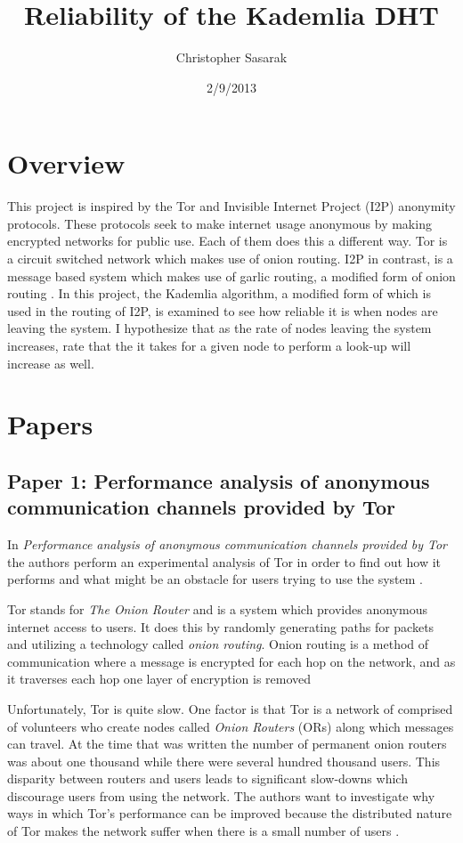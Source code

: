 \documentclass[notitlepage,12pt]{article}
\author{Christopher Sasarak}
\date{2/9/2013}
\title{Reliability of the Kademlia DHT}
\begin{document}
\maketitle

\section{Overview}
\label{sec:over}

This project is inspired by the Tor and Invisible Internet Project (I2P)
anonymity protocols. These protocols seek to make internet usage anonymous by
making encrypted networks for public use. Each of them does this a different
way. Tor is a circuit switched network which makes use of onion
routing\cite{tor}. I2P in contrast, is a message based system which makes use of
garlic routing, a modified form of onion routing \cite{i2p}. In this project,
the Kademlia algorithm, a modified form of which is used in the routing of I2P,
is examined to see how reliable it is when nodes are leaving the system. I
hypothesize that as the rate of nodes leaving the system increases, rate that
the it takes for a given node to perform a look-up will increase as well.

\section{Papers}
\label{sec:papers}

\subsection{Paper 1: Performance analysis of anonymous communication channels provided by Tor}
\label{sec:Tor}

In \emph{Performance analysis of anonymous communication channels
  provided by Tor} the authors perform an experimental analysis of Tor
in order to find out how it performs and what might be an obstacle for
users trying to use the system \cite[p.1]{tor}. 

Tor stands for \emph{The Onion Router} and is a system which provides
anonymous internet access to users. It does this by randomly
generating paths for packets and utilizing a technology called
\emph{onion routing}. Onion routing is a method of communication where
a message is encrypted for each hop on the network, and as it
traverses each hop one layer of encryption is removed \cite[p. 1]{tor}

Unfortunately, Tor is quite slow. One factor is that Tor is a network
of comprised of volunteers who create nodes called \emph{Onion Routers} (ORs)
along which messages can travel\cite[p. 2]{tor}. At the time that
\cite{tor} was written the number of permanent onion routers was about
one thousand while there were several hundred thousand users. This
disparity between routers and users leads to significant slow-downs
which discourage users from using the network.  The authors want to
investigate why ways in which Tor's performance can be improved
because the distributed nature of Tor makes the network suffer when
there is a small number of users \cite[p. 1]{tor}. 
\end{document}
